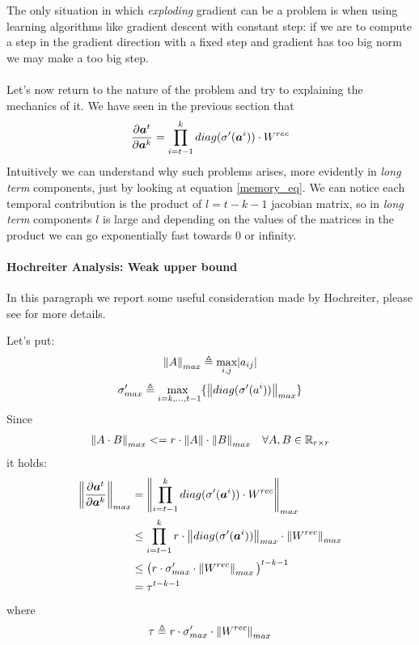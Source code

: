 The only situation in which \textit{exploding} gradient can be a problem is  when using learning algorithms like gradient descent with constant step:
if we are to compute a step in the gradient direction with a fixed step and gradient has too big norm we may make a too big step.
\\\\
Let's now return to the nature of the problem and try to explaining the mechanics of it.
We have seen in the previous section that
\begin{equation}
\frac{\partial \boldsymbol{a}^t}{\partial \boldsymbol{a}^k} = \prod_{i=t-1}^{k}  diag(\sigma'(\boldsymbol{a}^i)) \cdot W^{rec}
\label{memory_eq}
\end{equation}
Intuitively we can understand why such problems arises, more evidently in \textit{long term} components, just by looking at equation \ref{memory_eq}.
We can notice each temporal contribution is the product of $l=t-k-1$ jacobian matrix, so in \textit{long term} components $l$ is large and depending on
the values of the matrices in the product we can go exponentially fast towards 0 or infinity.

\paragraph{Hochreiter Analysis: Weak upper bound}
In this paragraph we report some useful consideration made by Hochreiter, please see \cite{lstm} for more details.

Let's put:
$$\left\Vert A \right\Vert_{max}\triangleq \underset{i,j}{\text{max}}|a_{ij}| $$
$$\sigma'_{max} \triangleq \underset{i=k,...,t-1}{\text{max  }} \{\left\Vert diag(\sigma'(a^i)) \right\Vert_{max}\}$$
Since
\begin{align}
\left\Vert A\cdot B \right\Vert_{max} &<= r \cdot \left\Vert A \right\Vert\cdot \left\Vert B \right\Vert_{max} & \forall A,B \in \mathbb{R}_{r\times r} 
\end{align}
it holds:
\begin{align}
\left\Vert \frac{\partial \boldsymbol{a}^t}{\partial \boldsymbol{a}^k} \right\Vert_{max} &= \left\Vert  \prod_{i=t-1}^{k}  diag(\sigma'(\boldsymbol{a}^i)) \cdot W^{rec}  \right\Vert_{max}\\
&\leq \prod_{i=t-1}^{k} r \cdot \left\Vert diag(\sigma'(\boldsymbol{a}^i)) \right\Vert_{max} \cdot \left\Vert W^{rec} \right\Vert_{max}\\
&\leq \big(r \cdot \sigma'_{max} \cdot \left\Vert W^{rec} \right\Vert_{max}\big)^{t-k-1} \\
&= \tau^{t-k-1}
\end{align}
where $$\tau \triangleq r \cdot \sigma'_{max} \cdot \left\Vert W^{rec} \right\Vert_{max}$$

